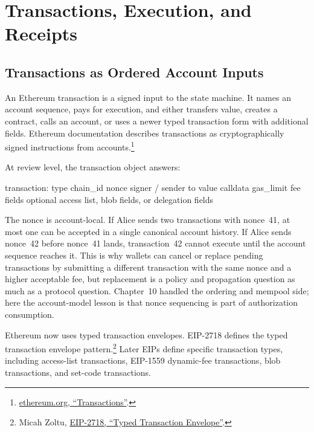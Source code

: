 \section{Transactions, Execution, and Receipts}

\subsection{Transactions as Ordered Account Inputs}

An Ethereum transaction is a signed input to the state machine. It names an account sequence, pays for execution, and either transfers value, creates a contract, calls an account, or uses a newer typed transaction form with additional fields. Ethereum documentation describes transactions as cryptographically signed instructions from accounts.\footnote{\href{https://ethereum.org/developers/docs/transactions/}{ethereum.org, ``Transactions''}.}

At review level, the transaction object answers:

\begin{codeblock}
transaction:
    type
    chain_id
    nonce
    signer / sender
    to
    value
    calldata
    gas_limit
    fee fields
    optional access list, blob fields, or delegation fields
\end{codeblock}

The nonce is account-local. If Alice sends two transactions with nonce~41, at most one can be accepted in a single canonical account history. If Alice sends nonce~42 before nonce~41 lands, transaction~42 cannot execute until the account sequence reaches it. This is why wallets can cancel or replace pending transactions by submitting a different transaction with the same nonce and a higher acceptable fee, but replacement is a policy and propagation question as much as a protocol question. Chapter~10 handled the ordering and mempool side; here the account-model lesson is that nonce sequencing is part of authorization consumption.

Ethereum now uses typed transaction envelopes. EIP-2718 defines the typed transaction envelope pattern.\footnote{Micah Zoltu, \href{https://eips.ethereum.org/EIPS/eip-2718}{EIP-2718, ``Typed Transaction Envelope''}.} Later EIPs define specific transaction types, including access-list transactions, EIP-1559 dynamic-fee transactions, blob transactions, and set-code transactions.

